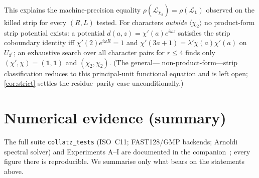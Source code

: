 \documentclass[11pt]{article}
\newcommand{\Lcal}{\mathcal{L}}
\newcommand{\UQ}{U_{3^r}}
\theoremstyle{plain}
\theoremstyle{definition}
\theoremstyle{remark}
\begin{document}
\noindent This explains the machine-precision equality
$\rho(\Lcal_{\chi_2})=\rho(\Lcal_{\mathbf1})$ observed on the killed strip for
every $(R,L)$ tested. For characters \emph{outside} $\langle\chi_2\rangle$ no
product-form strip potential exists: a potential
$d(a,z)=\chi'(a)e^{i\omega z}$ satisfies the strip coboundary identity iff
$\chi'(2)e^{i\omega R}=1$ and $\chi'(3a+1)=\lambda'\chi(a)\chi'(a)$ on $\UQ$; an
exhaustive search over all character pairs for $r\le4$ finds only
$(\chi',\chi)=(\mathbf1,\mathbf1)$ and $(\chi_2,\chi_2)$. (The general---%
non-product-form---strip classification reduces to this principal-unit
functional equation and is left open; \cref{cor:strict} settles the
residue--parity case unconditionally.)

\part{Numerical evidence (summary)}
\label{sec:numerics}

The full suite \texttt{collatz\_tests} (ISO~C11; \textsf{FAST128}/\textsf{GMP}
backends; Arnoldi spectral solver) and Experiments A--I are documented in the
companion~\cite{companion}; every figure there is reproducible. We summarise only
what bears on the statements above.
\end{document}
